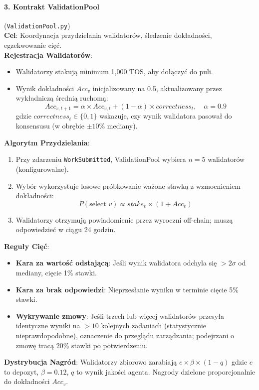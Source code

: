\documentclass[11pt]{article}
\begin{document}
\paragraph{3. Kontrakt ValidationPool} (\texttt{ValidationPool.py})\\
\textbf{Cel}: Koordynacja przydzielania walidatorów, śledzenie dokładności, egzekwowanie cięć.\\
\textbf{Rejestracja Walidatorów}:
\begin{itemize}[noitemsep]
  \item Walidatorzy stakują minimum 1,000 TOS, aby dołączyć do puli.
  \item Wynik dokładności $Acc_v$ inicjalizowany na 0.5, aktualizowany przez wykładniczą średnią ruchomą:
    \begin{equation}
    Acc_{v,t+1} = \alpha \times Acc_{v,t} + (1-\alpha) \times correctness_t, \quad \alpha = 0.9
    \end{equation}
    gdzie $correctness_t \in \{0,1\}$ wskazuje, czy wynik walidatora pasował do konsensusu (w obrębie $\pm10\%$ mediany).
\end{itemize}
\textbf{Algorytm Przydzielania}:
\begin{enumerate}[noitemsep]
  \item Przy zdarzeniu \texttt{WorkSubmitted}, ValidationPool wybiera $n=5$ walidatorów (konfigurowalne).
  \item Wybór wykorzystuje losowe próbkowanie ważone stawką z wzmocnieniem dokładności:
    \begin{equation}
    P(\text{select } v) \propto stake_v \times (1 + Acc_v)
    \end{equation}
  \item Walidatorzy otrzymują powiadomienie przez wyroczni off-chain; muszą odpowiedzieć w ciągu 24 godzin.
\end{enumerate}
\textbf{Reguły Cięć}:
\begin{itemize}[noitemsep]
  \item \textbf{Kara za wartość odstającą}: Jeśli wynik walidatora odchyla się $>2\sigma$ od mediany, cięcie 1\% stawki.
  \item \textbf{Kara za brak odpowiedzi}: Nieprzesłanie wyniku w terminie cięcie 5\% stawki.
  \item \textbf{Wykrywanie zmowy}: Jeśli trzech lub więcej walidatorów przesyła identyczne wyniki na $>10$ kolejnych zadaniach (statystycznie nieprawdopodobne), oznaczenie do przeglądu zarządzania; podejrzani o zmowę tracą 20\% stawki po potwierdzeniu.
\end{itemize}
\textbf{Dystrybucja Nagród}: Walidatorzy zbiorowo zarabiają $e \times \beta \times (1-q)$ gdzie $e$ to depozyt, $\beta=0.12$, $q$ to wynik jakości agenta. Nagrody dzielone proporcjonalnie do dokładności $Acc_v$.
\end{document}
